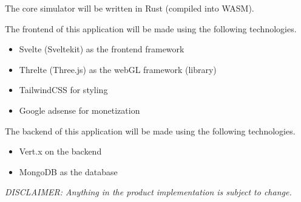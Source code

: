 \documentclass[12pt]{article}
\begin{document}
The core simulator will be written in Rust (compiled into WASM).

The frontend of this application will be made using the following technologies.\\
\begin{itemize}
    \item Svelte (Sveltekit) as the frontend framework
    \item Threlte (Three.js) as the webGL framework (library)
    \item TailwindCSS for styling
    \item Google adsense for monetization
\end{itemize}
The backend of this application will be made using the following technologies.
\begin{itemize}
    \item Vert.x on the backend
    \item MongoDB as the database
\end{itemize}

\textit{DISCLAIMER: Anything in the product implementation is subject to change.}
\end{document}
